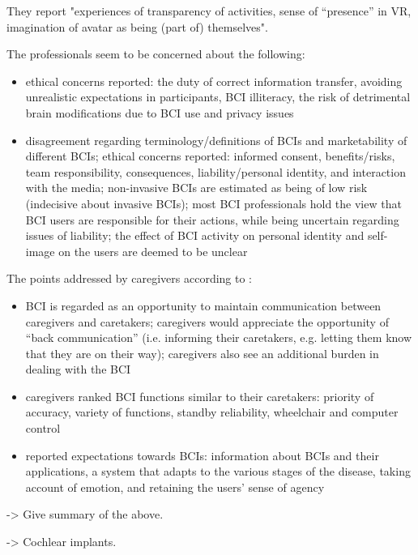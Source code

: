 \documentclass[fleqn,11pt]{olplainarticle}
\begin{document}
They report "experiences of transparency of activities, sense of “presence” in VR, imagination of avatar as being (part of) themselves".

The professionals seem to be concerned about the following:
\begin{itemize}
    \item ethical concerns reported: the duty of correct information transfer, avoiding unrealistic expectations in participants, BCI illiteracy, the risk of detrimental brain modifications due to BCI use and privacy issues
    \item disagreement regarding terminology/definitions of BCIs and marketability of different BCIs; ethical concerns reported: informed consent, benefits/risks, team responsibility, consequences, liability/personal identity, and interaction with the media; non-invasive BCIs are estimated as being of low risk (indecisive about invasive BCIs); most BCI professionals hold the view that BCI users are responsible for their actions, while being uncertain regarding issues of liability; the effect of BCI activity on personal identity and self-image on the users are deemed to be unclear
\end{itemize}

The points addressed by caregivers according to \cite{kogel2019using}:
\begin{displayquote}
    \begin{itemize}
        \item BCI is regarded as an opportunity to maintain communication between caregivers and caretakers; caregivers would appreciate the opportunity of “back communication” (i.e. informing their caretakers, e.g. letting them know that they are on their way); caregivers also see an additional burden in dealing with the BCI
        \item caregivers ranked BCI functions similar to their caretakers: priority of accuracy, variety of functions, standby reliability, wheelchair and computer control
        \item reported expectations towards BCIs: information about BCIs and their applications, a system that adapts to the various stages of the disease, taking account of emotion, and retaining the users’ sense of agency
    \end{itemize}
\end{displayquote}

-> Give summary of the above.

-> Cochlear implants.
\end{document}
